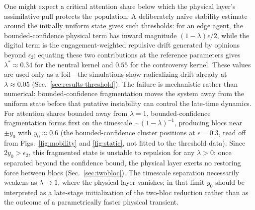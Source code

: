 \documentclass[5p,times,twocolumn]{elsarticle}
\begin{document}
One might expect a critical attention share below which the physical
layer's assimilative pull protects the population. A deliberately
na\"ive stability estimate around the initially uniform state gives such
thresholds: for an edge agent, the bounded-confidence physical term has
inward magnitude $(1-\lambda)\epsilon/2$, while the digital term is the
engagement-weighted repulsive drift generated by opinions beyond
$\epsilon_2$; equating these two contributions at the reference
parameters gives $\lambda^*\approx0.34$ for the neutral kernel and
$0.55$ for the controversy kernel. These values are used only as a
foil---the simulations show radicalizing drift already at
$\lambda\approx0.05$ (Sec.~\ref{sec:results-threshold}). The failure is
mechanistic rather than numerical: bounded-confidence fragmentation moves
the system away from the uniform state before that putative instability
can control the late-time dynamics.
For attention shares bounded away from $\lambda=1$, bounded-confidence
fragmentation forms first on the timescale $\sim(1-\lambda)^{-1}$,
producing blocs near $\pm y_0$ with $y_0 \approx 0.6$ (the
bounded-confidence cluster positions at $\epsilon=0.3$, read off from
Figs.~\ref{fig:mobility} and \ref{fig:static}, not fitted to the
threshold data). Since $2y_0>\epsilon_2$, this fragmented state is
unstable to repulsion for any $\lambda>0$: once separated beyond the
confidence bound, the physical layer exerts no restoring force between
blocs (Sec.~\ref{sec:twobloc}). The timescale separation necessarily
weakens as $\lambda\to1$, where the physical layer vanishes; in that
limit $y_0$ should be interpreted as a late-stage initialization of the
two-bloc reduction rather than as the outcome of a parametrically faster
physical transient.
\end{document}
